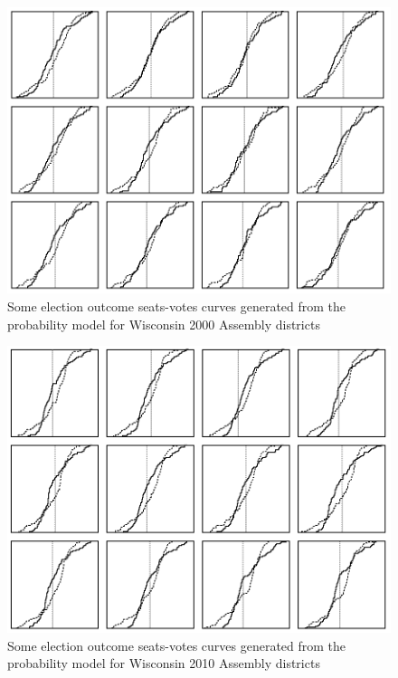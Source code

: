 \documentclass[preprint,12pt]{article}
\begin{document}
\begin{figure}[htb!]
    \begin{center}
        \includegraphics[scale=0.25]{../Figures/WI2000/4x4.png}
        \caption{Some election outcome seats-votes curves generated from the probability model for Wisconsin 2000 Assembly districts}\label{fig:SVAssembly2000}
    \end{center}
\end{figure}
\begin{figure}[htb!]
    \begin{center}
        \includegraphics[scale=0.25]{../Figures/WI2010/sv_curves_assembly.png}
        \caption{Some election outcome seats-votes curves generated from the probability model for Wisconsin 2010 Assembly districts}\label{fig:SVAssembly2010}
    \end{center}
\end{figure}
\end{document}
